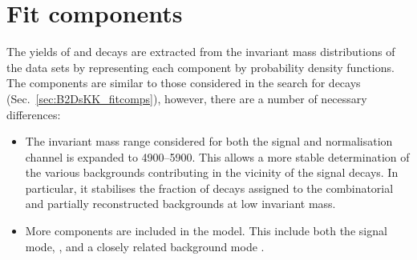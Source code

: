 



\section{Fit components}
\label{sec:B2DsPhi_fitcomponents}

The yields of \decay{\Bp}{\Dsp\phiz} and \decay{\Bp}{\Dsp\Dzb} decays are extracted from the invariant mass distributions of the data sets by representing each component by probability density functions. The components are similar to those considered in the search for \decay{\Bp}{\Dsp\Kp\Km} decays (Sec.~\ref{sec:B2DsKK_fitcomps}), however, there are a number of necessary differences:
\begin{itemize}
\item The \Bp invariant mass range considered for both the signal and normalisation channel is expanded to 4900--5900\mevcc. This allows a more stable determination of the various backgrounds contributing in the vicinity of the signal decays. In particular, it stabilises the fraction of decays assigned to the combinatorial and partially reconstructed backgrounds at low \Bp invariant mass.   
\item More components are included in the model. This include both the signal mode, \decay{\Bp}{\Dsp\phiz}, and a closely related background mode \decay{\Bp}{\Dssp\phiz}. 
\end{itemize}


